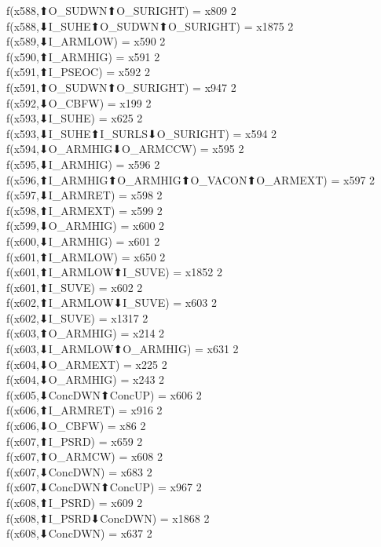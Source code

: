 f(x588,⬆O_SUDWN⬆O_SURIGHT) = x809 {2} \\
f(x588,⬇I_SUHE⬆O_SUDWN⬆O_SURIGHT) = x1875 {2} \\
f(x589,⬇I_ARMLOW) = x590 {2} \\
f(x590,⬆I_ARMHIG) = x591 {2} \\
f(x591,⬆I_PSEOC) = x592 {2} \\
f(x591,⬆O_SUDWN⬆O_SURIGHT) = x947 {2} \\
f(x592,⬇O_CBFW) = x199 {2} \\
f(x593,⬇I_SUHE) = x625 {2} \\
f(x593,⬇I_SUHE⬆I_SURLS⬇O_SURIGHT) = x594 {2} \\
f(x594,⬇O_ARMHIG⬇O_ARMCCW) = x595 {2} \\
f(x595,⬇I_ARMHIG) = x596 {2} \\
f(x596,⬆I_ARMHIG⬆O_ARMHIG⬆O_VACON⬆O_ARMEXT) = x597 {2} \\
f(x597,⬇I_ARMRET) = x598 {2} \\
f(x598,⬆I_ARMEXT) = x599 {2} \\
f(x599,⬇O_ARMHIG) = x600 {2} \\
f(x600,⬇I_ARMHIG) = x601 {2} \\
f(x601,⬆I_ARMLOW) = x650 {2} \\
f(x601,⬆I_ARMLOW⬆I_SUVE) = x1852 {2} \\
f(x601,⬆I_SUVE) = x602 {2} \\
f(x602,⬆I_ARMLOW⬇I_SUVE) = x603 {2} \\
f(x602,⬇I_SUVE) = x1317 {2} \\
f(x603,⬆O_ARMHIG) = x214 {2} \\
f(x603,⬇I_ARMLOW⬆O_ARMHIG) = x631 {2} \\
f(x604,⬇O_ARMEXT) = x225 {2} \\
f(x604,⬇O_ARMHIG) = x243 {2} \\
f(x605,⬇ConcDWN⬆ConcUP) = x606 {2} \\
f(x606,⬆I_ARMRET) = x916 {2} \\
f(x606,⬇O_CBFW) = x86 {2} \\
f(x607,⬆I_PSRD) = x659 {2} \\
f(x607,⬆O_ARMCW) = x608 {2} \\
f(x607,⬇ConcDWN) = x683 {2} \\
f(x607,⬇ConcDWN⬆ConcUP) = x967 {2} \\
f(x608,⬆I_PSRD) = x609 {2} \\
f(x608,⬆I_PSRD⬇ConcDWN) = x1868 {2} \\
f(x608,⬇ConcDWN) = x637 {2} \\
